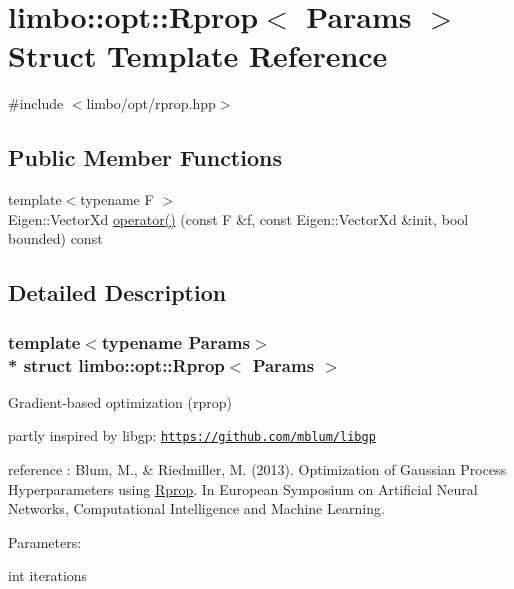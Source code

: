 \hypertarget{structlimbo_1_1opt_1_1_rprop}{}\section{limbo\+:\+:opt\+:\+:Rprop$<$ Params $>$ Struct Template Reference}
\label{structlimbo_1_1opt_1_1_rprop}


{\ttfamily \#include $<$limbo/opt/rprop.\+hpp$>$}

\subsection*{Public Member Functions}
\begin{DoxyCompactItemize}
\item 
{\footnotesize template$<$typename F $>$ }\\Eigen\+::\+Vector\+Xd \hyperlink{structlimbo_1_1opt_1_1_rprop_a6496d5e486ce1a5e8d0959194b8941bb}{operator()} (const F \&f, const Eigen\+::\+Vector\+Xd \&init, bool bounded) const 
\end{DoxyCompactItemize}


\subsection{Detailed Description}
\subsubsection*{template$<$typename Params$>$\\*
struct limbo\+::opt\+::\+Rprop$<$ Params $>$}

Gradient-\/based optimization (rprop)
\begin{DoxyItemize}
\item partly inspired by libgp\+: \href{https://github.com/mblum/libgp}{\tt https\+://github.\+com/mblum/libgp}
\item reference \+: Blum, M., \& Riedmiller, M. (2013). Optimization of Gaussian Process Hyperparameters using \hyperlink{structlimbo_1_1opt_1_1_rprop}{Rprop}. In European Symposium on Artificial Neural Networks, Computational Intelligence and Machine Learning.
\end{DoxyItemize}

Parameters\+:
\begin{DoxyItemize}
\item int iterations 
\end{DoxyItemize}

